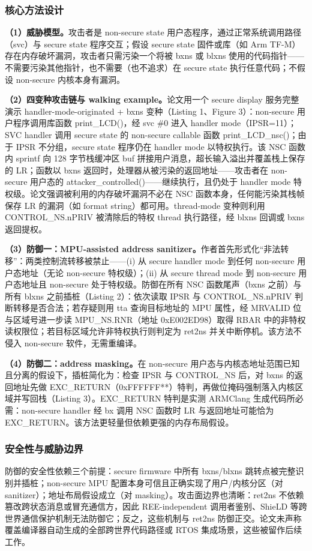 \documentclass[11pt]{ctexart}
\begin{document}
\subsubsection{核心方法设计}
\noindent\textbf{（1）威胁模型。}攻击者是 non-secure state 用户态程序，通过正常系统调用路径（svc）与 secure state 程序交互；假设 secure state 固件或库（如 Arm TF-M）存在内存破坏漏洞，攻击者只需污染一个将被 bxns 或 blxns 使用的代码指针——不需要污染其他指针，也不需要（也不追求）在 secure state 执行任意代码；不假设 non-secure 内核本身有漏洞。\par
\noindent\textbf{（2）四变种攻击链与 walking example。}论文用一个 secure display 服务完整演示 handler-mode-originated + bxns 变种（Listing 1、Figure 3）：non-secure 用户程序调用库函数 print\_LCD()，经 svc \#0 进入 handler mode（IPSR=11）；SVC handler 调用 secure state 的 non-secure callable 函数 print\_LCD\_nsc()；由于 IPSR 不分组，secure state 程序仍在 handler mode 以特权执行。该 NSC 函数内 sprintf 向 128 字节栈缓冲区 buf 拼接用户消息，超长输入溢出并覆盖栈上保存的 LR；函数以 bxns 返回时，处理器从被污染的返回地址——攻击者在 non-secure 用户态的 attacker\_controlled()——继续执行，且仍处于 handler mode 特权级。论文强调被利用的内存破坏漏洞不必在 NSC 函数本身，任何能污染其栈帧保存 LR 的漏洞（如 format string）都可用。thread-mode 变种则利用 CONTROL\_NS.nPRIV 被清除后的特权 thread 执行路径，经 blxns 回调或 bxns 返回提权。\par
\noindent\textbf{（3）防御一：MPU-assisted address sanitizer。}作者首先形式化``非法转移''：两类控制流转移被禁止——(i) 从 secure handler mode 到任何 non-secure 用户态地址（无论 non-secure 特权级）；(ii) 从 secure thread mode 到 non-secure 用户态地址且 non-secure 处于特权级。防御在所有 NSC 函数尾声（bxns 之前）与所有 blxns 之前插桩（Listing 2）：依次读取 IPSR 与 CONTROL\_NS.nPRIV 判断转移是否合法；若存疑则用 tta 查询目标地址的 MPU 属性，经 MRVALID 位与区域号进一步读 MPU\_NS.RNR（地址 0xE002ED98）取得 RBAR 中的非特权读权限位；若目标区域允许非特权执行则判定为 ret2ns 并关中断停机。该方法不侵入 non-secure 软件，无需重编译。\par
\noindent\textbf{（4）防御二：address masking。}在 non-secure 用户态与内核态地址范围已知且分离的假设下，插桩简化为：检查 IPSR 与 CONTROL\_NS 后，对 bxns 的返回地址先做 EXC\_RETURN（0xFFFFFF**）特判，再做位掩码强制落入内核区域并写回栈（Listing 3）。EXC\_RETURN 特判是实测 ARMClang 生成代码所必需：non-secure handler 经 bx 调用 NSC 函数时 LR 与返回地址可能恰为 EXC\_RETURN。该方法更轻量但依赖更强的内存布局假设。\par
\subsubsection{安全性与威胁边界}
防御的安全性依赖三个前提：secure firmware 中所有 bxns/blxns 跳转点被完整识别并插桩；non-secure MPU 配置本身可信且正确实现了用户/内核分区（对 sanitizer）；地址布局假设成立（对 masking）。攻击面边界也清晰：ret2ns 不依赖篡改跨状态消息或冒充通信方，因此 REE-independent 调用者鉴别、ShieLD 等跨世界通信保护机制无法防御它；反之，这些机制与 ret2ns 防御正交。论文未声称覆盖编译器自动生成的全部跨世界代码路径或 RTOS 集成场景，这些被留作后续工作。\par
\end{document}
